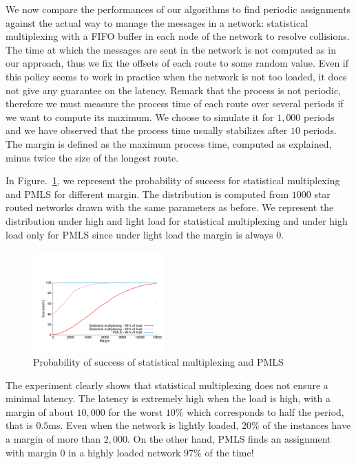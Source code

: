 \documentclass[10pt, conference, letterpaper]{IEEEtran}
\begin{document}
    We now compare the performances of our algorithms to find periodic assignments against the actual way to manage the messages in a network:  statistical multiplexing with a FIFO buffer in each node of the network to resolve collisions. The time at which the messages are sent in the network is not computed as in our approach, thus we fix the offsets of each route to some random value.
     Even if this policy seems to work in practice when the network is not too loaded, it does not give any guarantee on the latency. Remark that the process is not periodic, therefore we must measure the process time of each route over several periods if we want to compute its maximum. We choose to simulate it for $1,000$ periods and we have observed that the process time usually stabilizes after $10$ periods. The margin is defined as the maximum process time, computed as explained, minus twice the size of the longest route. 
	    
     In Figure.~\ref{fig:sto}, we represent the probability of success for statistical multiplexing and PMLS for different margin. The distribution is computed from $1000$ star routed networks drawn with the same parameters as before. We represent the distribution under high and light load for statistical multiplexing and under high load only for PMLS since under light load the margin is always $0$. 
     

    \begin{figure}
       \begin{center}
      \includegraphics[width = 0.45\textwidth]{stochastic.pdf}
      \end{center}
      \caption{Probability of success of statistical multiplexing and PMLS}
      \label{fig:sto}   
     \end{figure}    
 
     The experiment clearly shows that statistical multiplexing does not ensure a minimal latency. 
     The latency is extremely high when the load is high, with a margin of about $10,000$ for the worst $10\%$ which corresponds to half the period, that is $0.5$ms. Even when the network is lightly loaded, $20\%$ of the instances have a margin of more than $2,000$. On the other hand, PMLS finds an assignment with margin $0$ in a highly loaded network $97\%$ of the time! 
\end{document}
